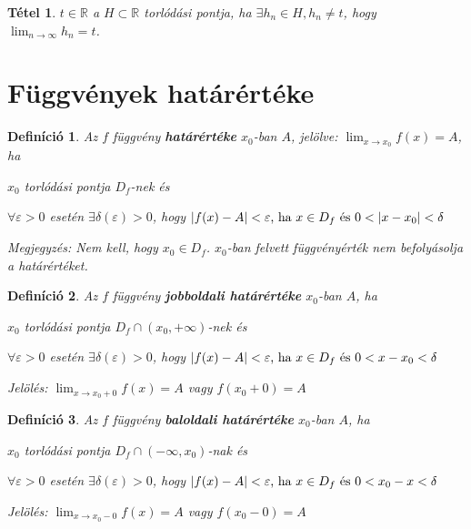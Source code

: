 \documentclass[a4paper,12pt,twoside]{book}
\newtheorem{tetel}{Tétel}[chapter]
\newtheorem{defi}{Definíció}[chapter]
\theoremstyle{break}
\theoremstyle{plain}
\begin{document}
\begin{tetel}
  $t\in\mathbb{R}$ a $H\subset \mathbb{R}$ torlódási pontja, ha $\exists h_n\in H, h_n \neq t$, hogy $\displaystyle \lim_{n\to\infty} h_n = t$.
\end{tetel}
\addtocounter{biz}{1}

\section{Függvények határértéke}

\begin{defi}
 Az $f$ függvény \textbf{határértéke} $x_0$-ban $A$, jelölve: $\displaystyle \lim_{x\to x_0} f(x) = A$, ha
 \begin{enumerate*}
  \item $x_0$ torlódási pontja $D_f$-nek és
  \item $\forall \varepsilon>0$ esetén $\exists \delta(\varepsilon)>0$, hogy
  $|f(x)-A|<\varepsilon \hbox{, ha } x\in D_f \hbox{ és } 0<|x-x_0|<\delta$
 \end{enumerate*}
\emph{Megjegyzés}: Nem kell, hogy $x_0\in D_f$. $x_0$-ban felvett függvényérték nem befolyásolja a határértéket.
\end{defi}

\begin{defi}
 Az $f$ függvény \textbf{jobboldali határértéke} $x_0$-ban $A$, ha
 \begin{enumerate*}
  \item $x_0$ torlódási pontja $D_f\cap(x_0,+\infty)$-nek és
  \item $\forall \varepsilon>0$ esetén $\exists \delta(\varepsilon)>0$, hogy
  $|f(x)-A|<\varepsilon \hbox{, ha } x\in D_f \hbox{ és } 0<x-x_0<\delta$
 \end{enumerate*}
\emph{Jelölés}: $\displaystyle \lim_{x\to x_0+0} f(x) = A$ vagy $f(x_0+0) = A$
\end{defi}

\begin{defi}
 Az $f$ függvény \textbf{baloldali határértéke} $x_0$-ban $A$, ha
 \begin{enumerate*}
  \item $x_0$ torlódási pontja $D_f\cap(-\infty,x_0)$-nak és
  \item $\forall \varepsilon>0$ esetén $\exists \delta(\varepsilon)>0$, hogy
  $|f(x)-A|<\varepsilon \hbox{, ha } x\in D_f \hbox{ és } 0<x_0-x<\delta$
 \end{enumerate*}
\emph{Jelölés}: $\displaystyle \lim_{x\to x_0-0} f(x) = A$ vagy $f(x_0-0) = A$
\end{defi}
\end{document}
